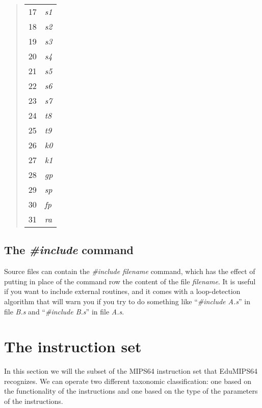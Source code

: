 \documentclass[letterpaper,10pt,english]{sphinxmanual}
\begin{document}
\begin{quote}
\begin{longtable}{|l|l|}
17
 & 
\emph{s1}
\\

18
 & 
\emph{s2}
\\

19
 & 
\emph{s3}
\\

20
 & 
\emph{s4}
\\

21
 & 
\emph{s5}
\\

22
 & 
\emph{s6}
\\

23
 & 
\emph{s7}
\\

24
 & 
\emph{t8}
\\

25
 & 
\emph{t9}
\\

26
 & 
\emph{k0}
\\

27
 & 
\emph{k1}
\\

28
 & 
\emph{gp}
\\

29
 & 
\emph{sp}
\\

30
 & 
\emph{fp}
\\

31
 & 
\emph{ra}
\\
\hline
\end{longtable}

\end{quote}


\section{The \emph{\#include} command}
\label{source-files-format:the-include-command}
Source files can contain the \emph{\#include filename} command, which has the
effect of putting in place of the command row the content of the file
\emph{filename}.
It is useful if you want to include external routines, and it comes with a
loop-detection algorithm that will warn you if you try to do something like
``\emph{\#include A.s}'' in file \emph{B.s} and ``\emph{\#include B.s}'' in file \emph{A.s}.


\chapter{The instruction set}
\label{instructions::doc}\label{instructions:the-instruction-set}
In this section we will the subset of the MIPS64 instruction set that EduMIPS64
recognizes. We can operate two different taxonomic classification: one based on
the functionality of the instructions and one based on the type of the
parameters of the instructions.
\end{document}
